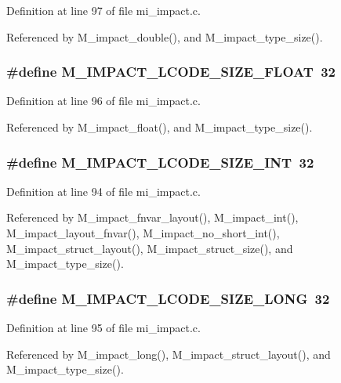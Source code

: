 Definition at line 97 of file mi\_\-impact.c.

Referenced by M\_\-impact\_\-double(), and M\_\-impact\_\-type\_\-size().
\subsubsection{\setlength{\rightskip}{0pt plus 5cm}\#define M\_\-IMPACT\_\-LCODE\_\-SIZE\_\-FLOAT~32}\label{mi__impact_8c_120dfccdb114ff29cdd1ecfbeafd09ba}




Definition at line 96 of file mi\_\-impact.c.

Referenced by M\_\-impact\_\-float(), and M\_\-impact\_\-type\_\-size().
\subsubsection{\setlength{\rightskip}{0pt plus 5cm}\#define M\_\-IMPACT\_\-LCODE\_\-SIZE\_\-INT~32}\label{mi__impact_8c_dbe5326b968d413a116ff7e6faef37dc}




Definition at line 94 of file mi\_\-impact.c.

Referenced by M\_\-impact\_\-fnvar\_\-layout(), M\_\-impact\_\-int(), M\_\-impact\_\-layout\_\-fnvar(), M\_\-impact\_\-no\_\-short\_\-int(), M\_\-impact\_\-struct\_\-layout(), M\_\-impact\_\-struct\_\-size(), and M\_\-impact\_\-type\_\-size().
\subsubsection{\setlength{\rightskip}{0pt plus 5cm}\#define M\_\-IMPACT\_\-LCODE\_\-SIZE\_\-LONG~32}\label{mi__impact_8c_08a40a503b7751740c8f38266779702a}




Definition at line 95 of file mi\_\-impact.c.

Referenced by M\_\-impact\_\-long(), M\_\-impact\_\-struct\_\-layout(), and M\_\-impact\_\-type\_\-size().
